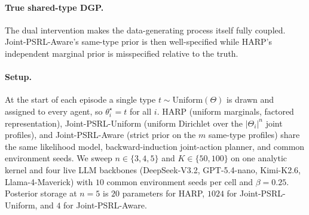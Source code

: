 \paragraph{True shared-type DGP.}
The dual intervention makes the data-generating process itself fully coupled. Joint-PSRL-Aware's same-type prior is then well-specified while HARP's independent marginal prior is misspecified relative to the truth.

\paragraph{Setup.} At the start of each episode a single type $t \sim \mathrm{Uniform}(\Theta)$ is drawn and assigned to every agent, so $\theta_i^\star = t$ for all $i$. HARP (uniform marginals, factored representation), Joint-PSRL-Uniform (uniform Dirichlet over the $|\Theta_i|^n$ joint profiles), and Joint-PSRL-Aware (strict prior on the $m$ same-type profiles) share the same likelihood model, backward-induction joint-action planner, and common environment seeds. We sweep $n\!\in\!\{3,4,5\}$ and $K\!\in\!\{50,100\}$ on one analytic kernel and four live LLM backbones (DeepSeek-V3.2, GPT-5.4-nano, Kimi-K2.6, Llama-4-Maverick) with $10$ common environment seeds per cell and $\beta{=}0.25$. Posterior storage at $n{=}5$ is $20$ parameters for HARP, $1024$ for Joint-PSRL-Uniform, and $4$ for Joint-PSRL-Aware.

